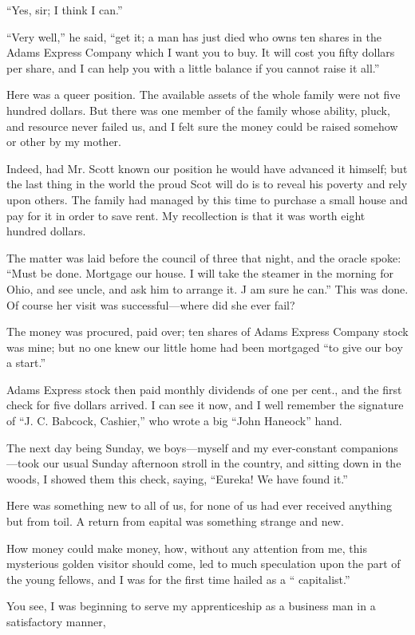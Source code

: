 \documentclass[11pt,openany]{book}
\begin{document}
``Yes, sir; I think I can.''

``Very well,'' he said, ``get it; a man has just died who owns ten shares in the Adams Express Company which I want you to buy. It will cost you fifty dollars per share, and I can help you with a little balance if you cannot raise it all.''

Here was a queer position. The available assets of the whole family were not five hundred dollars. But there was one member of the family whose ability, pluck, and resource never failed us, and I felt sure the money could be raised somehow or other by my mother.

Indeed, had Mr. Scott known our position he would have advanced it himself; but the last thing in the world the proud Scot will do is to reveal his poverty and rely upon others. The family had managed by this time to purchase a small house and pay for it in order to save rent. My recollection is that it was worth eight hundred dollars.

The matter was laid before the council of three that night, and the oracle spoke: ``Must be done. Mortgage our house. I will take the steamer in the morning for Ohio, and see uncle, and ask him to arrange it. J am sure he can.'' This was done. Of course her visit was successful---where did she ever fail?

The money was procured, paid over; ten shares of Adams Express Company stock was mine; but no one knew our little home had been mortgaged ``to give our boy a start.''

Adams Express stock then paid monthly dividends of one per cent., and the first check for five dollars arrived. I can see it now, and I well remember the signature of ``J. C. Babcock, Cashier,'' who wrote a big ``John Haneock'' hand.

The next day being Sunday, we boys---myself and my ever-constant companions---took our usual Sunday afternoon stroll in the country, and sitting down in the woods, I showed them this check, saying, ``Eureka! We have found it.''

Here was something new to all of us, for none of us had ever received anything but from toil. A return from eapital was something strange and new.

How money could make money, how, without any attention from me, this mysterious golden visitor should come, led to much speculation upon the part of the young fellows, and I was for the first time hailed as a `` capitalist.''

You see, I was beginning to serve my apprenticeship as a business man in a satisfactory manner,
\end{document}
